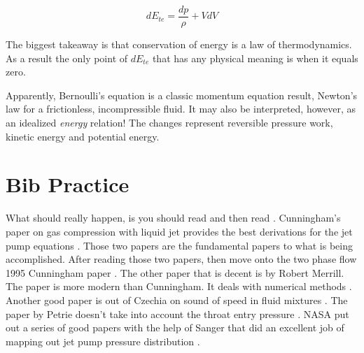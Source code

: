\documentclass{article}
\begin{document}
\begin{equation}
    dE_{te} = \frac{dp}{\rho} + VdV
\end{equation}

The biggest takeaway is that conservation of energy is a law of thermodynamics. As a result the only point of $dE_{te}$ that has any physical meaning is when it equals zero.

Apparently, Bernoulli's equation is a classic momentum equation result, Newton's law for a frictionless, incompressible fluid. It may also be interpreted, however, as an idealized \emph{energy} relation! The changes represent reversible pressure work, kinetic energy and potential energy.

\section{Bib Practice}

What should really happen, is you should read \cite{cunn_gas} and then read \cite{cunn_break}. Cunningham's paper on gas compression with liquid jet provides the best derivations for the jet pump equations \cite{cunn_gas}. Those two papers are the fundamental papers to what is being accomplished. After reading those two papers, then move onto the two phase flow 1995 Cunningham paper \cite{cunn_two}. The other paper that is decent is by Robert Merrill. The paper is more modern than Cunningham. It deals with numerical methods \cite{merrill}. Another good paper is out of Czechia on sound of speed in fluid mixtures \cite{himr}. The paper by Petrie doesn't take into account the throat entry pressure \cite{petrie}. NASA put out a series of good papers with the help of Sanger that did an excellent job of mapping out jet pump pressure distribution \cite{sanger}.

\printbibliography
\end{document}
